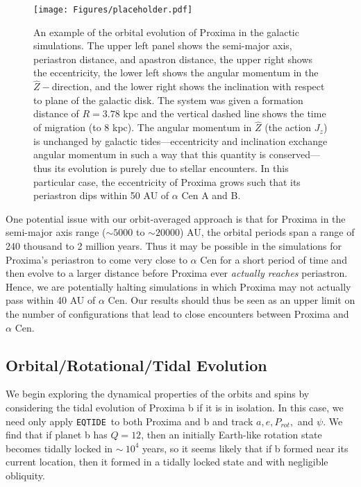 \documentclass[preprint,12pt]{aastex}
\def\eqtide{\texttt{\footnotesize{EQTIDE}}\xspace}
\begin{document}
\begin{figure}
\texttt{[image: Figures/placeholder.pdf]}
\caption{An example of the orbital evolution of Proxima in the galactic 
  simulations. The upper left panel shows the semi-major axis, periastron 
  distance, and apastron distance, the upper right shows the eccentricity, 
  the lower left shows the angular momentum in the $\hat{Z}-$direction, 
  and the lower right shows the inclination with respect to plane of the 
  galactic disk. The system was given a formation distance of $R = 3.78$ 
  kpc and the vertical dashed line shows the time of migration (to 8 kpc). 
  The angular momentum in $\hat{Z}$ (the action $J_z$) is unchanged by 
  galactic tides---eccentricity and inclination exchange angular momentum 
  in such a way that this quantity is conserved---thus its evolution is purely 
  due to stellar encounters. In this particular case, the eccentricity of Proxima 
  grows such that its periastron dips within 50 AU of $\alpha$ Cen A and B.}
\label{fig:galevolution}
\end{figure}

One potential issue with our orbit-averaged approach is that for Proxima in the 
semi-major axis range ($\sim5000$ to $\sim20000$) AU, the orbital periods 
span a range of 240 thousand to 2 million years. Thus it may be possible in 
the simulations for Proxima's periastron to come very close to $\alpha$ Cen 
for a short period of time and then evolve to a larger distance before Proxima 
ever \emph{actually reaches} periastron. Hence, we are potentially halting 
simulations in which 
Proxima may not actually pass within 40 AU of $\alpha$ Cen. Our results 
should thus be seen as an upper limit on the number of configurations 
that lead to close encounters between Proxima and $\alpha$ Cen.
 
\subsection{Orbital/Rotational/Tidal Evolution}
\label{sec:results:orbital}

We begin exploring the dynamical properties of the orbits and spins by
considering the tidal evolution of Proxima b if it is in isolation. In
this case, we need only apply \eqtide~to both Proxima and b and track
$a, e, P_{rot},$ and $\psi$. We find that if planet b has $Q=12$,
then an initially Earth-like rotation state becomes tidally locked in
$\sim~10^4$ years, so it seems likely that if b formed near its
current location, then it formed in a tidally locked state and with
negligible obliquity.
\end{document}
